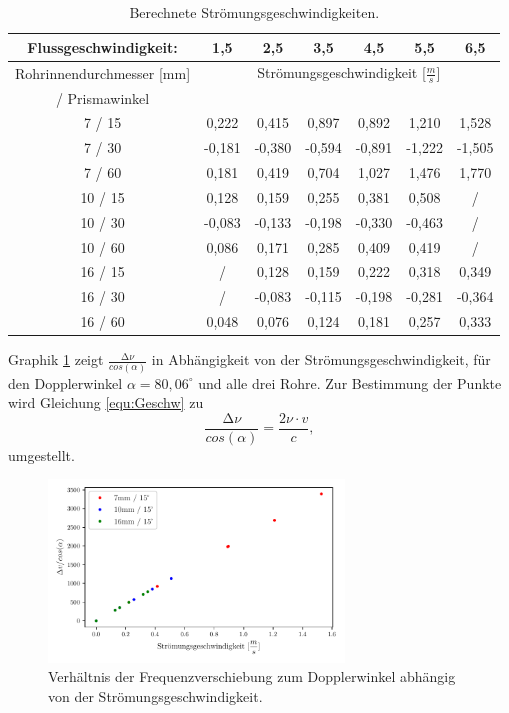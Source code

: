 \begin{table}
    \centering
    \caption{Berechnete Strömungsgeschwindigkeiten.}
    \label{tab:Geschw}

    \begin{tabular}{c | c c c c c c}
        \toprule
        Flussgeschwindigkeit:& 1,5 & 2,5 & 3,5 & 4,5 & 5,5 & 6,5 \\ 
        \midrule
        Rohrinnendurchmesser [mm]   & \multicolumn{6}{c}{Strömungsgeschwindigkeit [$\frac{m}{s}$]} \\
        / Prismawinkel & & & & & & \\
        \midrule
        7 / 15  & 0,222 & 0,415 & 0,897 & 0,892 & 1,210 & 1,528 \\
        7 / 30  &-0,181 &-0,380 &-0,594 &-0,891 &-1,222 &-1,505 \\
        7 / 60  & 0,181 & 0,419 & 0,704 & 1,027 & 1,476 & 1,770 \\
        10 / 15 & 0,128 & 0,159 & 0,255 & 0,381 & 0,508 & /     \\
        10 / 30 &-0,083 &-0,133 &-0,198 &-0,330 &-0,463 & /     \\
        10 / 60 & 0,086 & 0,171 & 0,285 & 0,409 & 0,419 & /     \\
        16 / 15 &  /    & 0,128 & 0,159 & 0,222 & 0,318 & 0,349 \\
        16 / 30 &  /    &-0,083 &-0,115 &-0,198 &-0,281 &-0,364 \\
        16 / 60 & 0,048 & 0,076 & 0,124 & 0,181 & 0,257 & 0,333 \\
        \bottomrule
    \end{tabular}
\end{table}

Graphik \ref{fig:KeineAhnung} zeigt $\frac{\increment \nu}{cos(\alpha)}$ in Abhängigkeit von der Strömungsgeschwindigkeit, für den Dopplerwinkel 
$\alpha = 80,06^{\circ}$ und alle drei Rohre.
Zur Bestimmung der Punkte wird Gleichung \eqref{equ:Geschw} zu 
\begin{equation}
    \frac{\increment \nu}{cos(\alpha)} = \frac{2\nu \cdot v}{c},
\end{equation}
umgestellt.

\begin{figure}
    \centering
    \includegraphics[width = 0.70\textwidth]{plot1.pdf}
    \caption{Verhältnis der Frequenzverschiebung zum Dopplerwinkel abhängig von der Strömungsgeschwindigkeit.}
    \label{fig:KeineAhnung}
\end{figure}

